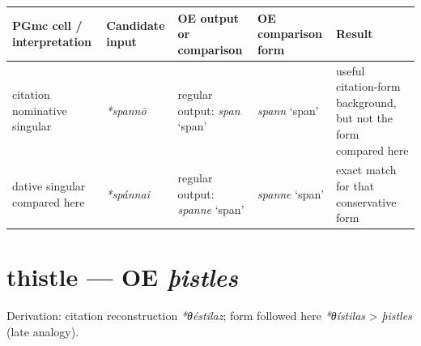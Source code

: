 \documentclass[
  british,
  a4paper,
  openany]{book}
\newcounter{none} %
\providecommand{\texorpdfstring}[2]{#1}
\begin{document}
{\def\LTcaptype{none} %
\begin{longtable}[]{@{}
  >{\raggedright\arraybackslash}p{}
  >{\raggedright\arraybackslash}p{}
  >{\raggedright\arraybackslash}p{}
  >{\raggedright\arraybackslash}p{}
  >{\raggedright\arraybackslash}p{}@{}}
\toprule\noalign{}
\begin{minipage}[b]{\linewidth}\raggedright
PGmc cell / interpretation
\end{minipage} & \begin{minipage}[b]{\linewidth}\raggedright
Candidate input
\end{minipage} & \begin{minipage}[b]{\linewidth}\raggedright
OE output or comparison
\end{minipage} & \begin{minipage}[b]{\linewidth}\raggedright
OE comparison form
\end{minipage} & \begin{minipage}[b]{\linewidth}\raggedright
Result
\end{minipage} \\
\midrule\noalign{}
\endhead
\bottomrule\noalign{}
\endlastfoot
citation nominative singular & {\emph{*spannō}} & regular output:
{\emph{span}} `span' & {\emph{spann}} `span' & useful citation-form
background, but not the form compared here \\
dative singular compared here & {\emph{*spánnai}} & regular output:
{\emph{spanne}} `span' & {\emph{spanne}} `span' & exact match for that
conservative form \\
\end{longtable}
}

\section{\texorpdfstring{thistle --- OE
\emph{þistles}}{thistle --- OE þistles}}\label{thistle-oe-uxfeistles}


Derivation: citation reconstruction \emph{*θéstilaz}; form followed here
\emph{*θístilas} \textgreater{} \emph{þistles} (late analogy).
\end{document}
